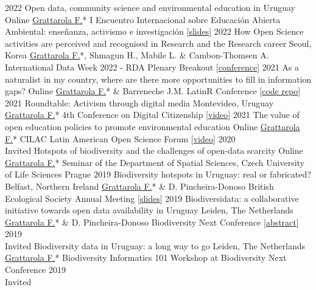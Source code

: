 \documentclass[9pt]{developercv} %
\begin{document}
\begin{entrylist}
	\entrylong
		{2022}
		{Open data, community science and environmental education in Uruguay}
		{Online}
		{\underline{Grattarola F.}* \slashsep I Encuentro Internacional sobre Educación Abierta Ambiental: enseñanza, activismo e investigación [\href{https://flograttarola.com/pdf/IEEAA_2022.pdf}{slides}]}
	\entrylong
		{2022}
		{How Open Science activities are perceived and recognised in Research and the Research career}
		{Seoul, Korea}
		{\underline{Grattarola F.}*, Shmagun H., Mabile L. \& Cambon-Thomsen A. \slashsep International Data Week 2022 - RDA Plenary Breakout [\href{https://www.idw2022.org}{conference}]}
	\entrylong
		{2021}
		{As a naturalist in my country, where are there more opportunities to fill in information gaps?}
		{Online}
		{\underline{Grattarola F.}* \& Barreneche J.M. \slashsep LatinR Conference [\href{https://github.com/bienflorencia/LatinR2021}{code repo}]}
	\entrylong
		{2021}
		{Roundtable: Activism through digital media}
		{Montevideo, Uruguay}
		{\underline{Grattarola F.}* \slashsep 4th Conference on Digital Citizenship [\href{https://youtu.be/NNA46QEZVQI}{video}]}
	\entrylong
		{2021}
		{The value of open education policies to promote environmental education}
		{Online}
		{\underline{Grattarola F.}* \slashsep CILAC Latin American Open Science Forum [\href{https://youtu.be/W6i6y87p2IM}{video}]}
	\entrylong
		{2020\\\footnotesize{Invited}}
		{Hotspots of biodiversity and the challenges of open-data scarcity}
		{Online}
		{\underline{Grattarola F.}* \slashsep Seminar of the Department of Spatial Sciences, Czech University of Life Sciences Prague}
	\entrylong
		{2019}
		{Biodiversity hotspots in Uruguay: real or fabricated?}
		{Belfast, Northern Ireland}
		{\underline{Grattarola F.}* \& D. Pincheira-Donoso \slashsep British Ecological Society Annual Meeting [\href{https://flograttarola.com/pdf/FGrattarola_BES2019_WEB.pdf}{slides}]}
	\entrylong
		{2019}
		{Biodiversidata: a collaborative initiative towards open data availability in Uruguay}
		{Leiden, The Netherlands}
		{\underline{Grattarola F.}* \& D. Pincheira-Donoso \slashsep Biodiversity Next Conference [\href{https://flograttarola.com/pdf/BISS_article_37715.pdf}{abstract}]}
	\entrylong
		{2019\\\footnotesize{Invited}}
		{Biodiversity data in Uruguay: a long way to go}
		{Leiden, The Netherlands}
		{\underline{Grattarola F.}* \slashsep Biodiversity Informatics 101 Workshop at Biodiversity Next Conference}
	\entrylong
		{2019\\\footnotesize{Invited}}

\end{entrylist}
\end{document}
